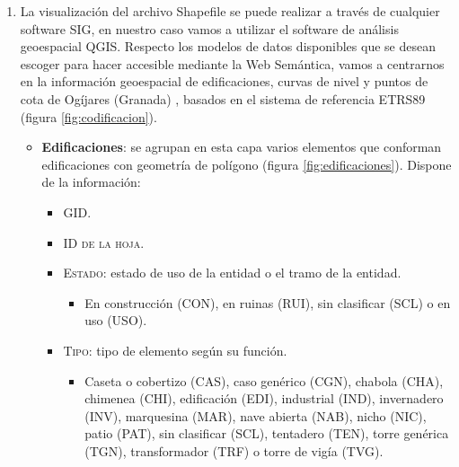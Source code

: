 \begin{enumerate}
	\item La visualización del archivo Shapefile se puede realizar a través de cualquier software SIG, en nuestro caso vamos a utilizar el software de análisis geoespacial QGIS. Respecto los modelos de datos disponibles que se desean escoger para hacer accesible mediante la Web Semántica, vamos a centrarnos en la información geoespacial de edificaciones, curvas de nivel y puntos de cota de Ogíjares (Granada) \cite{info-sh}, basados en el sistema de referencia ETRS89 (figura \ref{fig:codificacion}).
	

	

	

	\begin{itemize}
		\item \textbf{Edificaciones}: se agrupan en esta capa varios elementos que conforman edificaciones con geometría de polígono (figura \ref{fig:edificaciones}). Dispone de la información:
		
		\begin{itemize}
			\item \textsc{GID}.	
			\item \textsc{ID de la hoja}.
			\item \textsc{Estado}: estado de uso de la entidad o el tramo de la entidad.
			\begin{itemize}
				\item 	\small{En construcción (CON), en ruinas (RUI), sin clasificar (SCL) o en uso (USO).}
			\end{itemize}
			
			\item \textsc{Tipo}: tipo de elemento según su función.
			\begin{itemize}
				\item 	\small{Caseta o cobertizo (CAS), caso genérico (CGN), chabola (CHA), chimenea (CHI), edificación (EDI), industrial (IND), invernadero (INV), marquesina (MAR), nave abierta (NAB), nicho (NIC), patio (PAT), sin clasificar (SCL), tentadero (TEN), torre genérica (TGN), transformador (TRF) o torre de vigía (TVG).}
			\end{itemize}
			 
		\end{itemize}
	

\end{itemize}
\end{enumerate}
